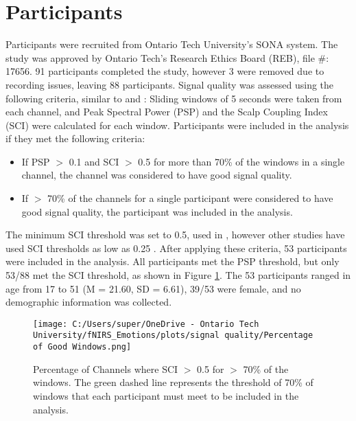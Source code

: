 \section{Participants}
\label{sec:participants}
Participants were recruited from Ontario Tech University's SONA system. 
The study was approved by Ontario Tech's Research Ethics Board (REB), file \#: 17656. 
91 participants completed the study, however 3 were removed due to recording issues, leaving 88 participants.
Signal quality was assessed using the following criteria, similar to \citep{bulgarelli_growth_2025} and \citep{hernandez_nirsplot_2020}: 
Sliding windows of 5 seconds were taken from each channel, and Peak Spectral Power (PSP) and the Scalp Coupling Index (SCI) \citep{pollonini_phoebe_2016} were calculated for each window.
Participants were included in the analysis if they met the following criteria:

\begin{itemize}
    \item If PSP $>$ 0.1 and SCI $>$ 0.5 for more than 70\% of the windows in a single channel, the channel was considered to have good signal quality.
    \item If $>$ 70\% of the channels for a single participant were considered to have good signal quality, the participant was included in the analysis.
\end{itemize}

The minimum SCI threshold was set to 0.5, used in \citep{holmes_opening_2024}, however other studies have used SCI thresholds as low as 0.25 \citep{zhou_autistic_2024}. 
After applying these criteria, 53 participants were included in the analysis. 
All participants met the PSP threshold, but only 53/88 met the SCI threshold, as shown in Figure \ref{fig:signal_quality}.
The 53 participants ranged in age from 17 to 51 (M = 21.60, SD = 6.61), 39/53 were female, and no demographic information was collected. 

\begin{figure}[H]
    \centering
    \texttt{[image: C:/Users/super/OneDrive - Ontario Tech University/fNIRS\_Emotions/plots/signal quality/Percentage of Good Windows.png]}
    \caption{Percentage of Channels where SCI $>$ 0.5 for $>$ 70\% of the windows.
    The green dashed line represents the threshold of 70\% of windows that each participant must meet to be included in the analysis.}
    \label{fig:signal_quality}
\end{figure}

